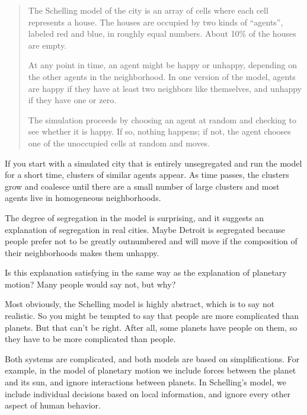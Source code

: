 \documentclass[12pt]{book}
\theoremstyle{exercise}
\begin{document}
\begin{quote}
The Schelling model of the city is an array of cells where each cell
represents a house.  The houses are occupied by two kinds of
``agents'', labeled red and blue, in roughly equal numbers.  About
10\% of the houses are empty.


At any point in time, an agent might be happy or unhappy, depending on
the other agents in the neighborhood.  In one version of the model,
agents are happy if they have at least two neighbors like themselves,
and unhappy if they have one or zero.


The simulation proceeds by choosing an agent at random and checking
to see whether it is happy.  If so, nothing happens; if not,
the agent chooses one of the unoccupied cells at
random and moves.
\end{quote}

If you start with a simulated city that is entirely unsegregated and
run the model for a short time, clusters of similar agents appear.  As
time passes, the clusters grow and coalesce until there are a small
number of large clusters and most agents live in homogeneous
neighborhoods.


The degree of segregation in the model is surprising, and it suggests
an explanation of segregation in real cities.  Maybe Detroit is
segregated because people prefer not to be greatly outnumbered and
will move if the composition of their neighborhoods makes them
unhappy.


Is this explanation satisfying in the same way as the explanation of
planetary motion?  Many people would say not, but why?

Most obviously, the Schelling model is highly abstract, which is to
say not realistic.  So you might be tempted to say that people are more complicated than planets.  But that can't be right.  After all, some planets have people on them, so they have to be more complicated than people.


Both systems are complicated, and both models are based on
simplifications.  For example, in the model of planetary motion we
include forces between the planet and its sun, and ignore interactions
between planets.  In Schelling's model, we include individual decisions
based on local information, and ignore every other aspect of human behavior. 
\end{document}
